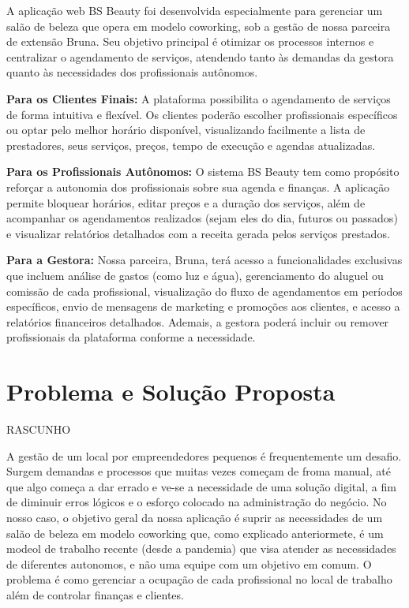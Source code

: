 A aplicação web BS Beauty foi desenvolvida especialmente para gerenciar um salão de beleza que opera em modelo coworking, sob a gestão de nossa parceira de extensão Bruna. Seu objetivo principal é otimizar os processos internos e centralizar o agendamento de serviços, atendendo tanto às demandas da gestora quanto às necessidades dos profissionais autônomos.

\noindent\textbf{Para os Clientes Finais:} A plataforma possibilita o agendamento de serviços de forma intuitiva e flexível. Os clientes poderão escolher profissionais específicos ou optar pelo melhor horário disponível, visualizando facilmente a lista de prestadores, seus serviços, preços, tempo de execução e agendas atualizadas.

\noindent\textbf{Para os Profissionais Autônomos:} O sistema BS Beauty tem como propósito reforçar a autonomia dos profissionais sobre sua agenda e finanças. A aplicação permite bloquear horários, editar preços e a duração dos serviços, além de acompanhar os agendamentos realizados (sejam eles do dia, futuros ou passados) e visualizar relatórios detalhados com a receita gerada pelos serviços prestados.

\noindent\textbf{Para a Gestora:} Nossa parceira, Bruna, terá acesso a funcionalidades exclusivas que incluem análise de gastos (como luz e água), gerenciamento do aluguel ou comissão de cada profissional, visualização do fluxo de agendamentos em períodos específicos, envio de mensagens de marketing e promoções aos clientes, e acesso a relatórios financeiros detalhados. Ademais, a gestora poderá incluir ou remover profissionais da plataforma conforme a necessidade.
\section{Problema e Solução Proposta}

RASCUNHO

A gestão de um local por empreendedores pequenos é frequentemente um desafio. Surgem demandas e processos que muitas vezes começam de froma manual, até que algo começa a dar errado e ve-se a necessidade de uma solução digital, a fim de diminuir erros lógicos e o esforço colocado na administração do negócio. No nosso caso, o objetivo geral da nossa aplicação é suprir as necessidades de um salão de beleza em modelo coworking que, como explicado anteriormete, é um modeol de trabalho recente (desde a pandemia) que visa atender as necessidades de diferentes autonomos, e não uma equipe com um objetivo em comum. O problema é como gerenciar a ocupação de cada profissional no local de trabalho além de controlar finanças e clientes. 

